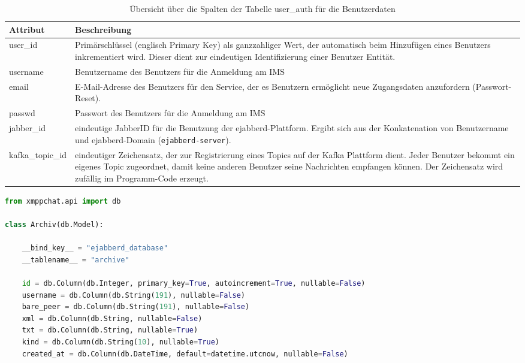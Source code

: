 \documentclass[a4paper,titlepage,halfparskip,12pt]{scrreprt}
\begin{document}
\begin{table}[h]
\centering
\caption{Übersicht über die Spalten der Tabelle user\_auth für die Benutzerdaten}
\begin{tabular}{|l|p{}|}
\hline
\textbf{Attribut} & \textbf{Beschreibung} \\
\hline
user\_id & Primärschlüssel (englisch Primary Key) als ganzzahliger Wert, der automatisch beim Hinzufügen eines Benutzers inkrementiert wird. Dieser dient zur eindeutigen Identifizierung einer Benutzer Entität.\\
\hline
username & Benutzername des Benutzers für die Anmeldung am \acs{IMS}\\
\hline
email & E-Mail-Adresse des Benutzers für den Service, der es Benutzern ermöglicht neue Zugangsdaten anzufordern (Passwort-Reset).\\
\hline
passwd & Passwort des Benutzers für die Anmeldung am \acs{IMS}\\
\hline
jabber\_id & eindeutige JabberID für die Benutzung der ejabberd-Plattform. Ergibt sich aus der Konkatenation von Benutzername und ejabberd-Domain (\texttt{ejabberd-server}).\\
\hline
kafka\_topic\_id & eindeutiger Zeichensatz, der zur Registrierung eines Topics auf der Kafka Plattform dient. Jeder Benutzer bekommt ein eigenes Topic zugeordnet, damit keine anderen Benutzer seine Nachrichten empfangen können. Der Zeichensatz wird zufällig im Programm-Code erzeugt.\\
\hline
\end{tabular}
\label{tab:descriptionUserClass}
\end{table}

\pagebreak

\begin{lstlisting}[language=python, caption={SQLAlchemy Schema für die Tabelle der Chatverläufe von ejabberd}, label={lst:flaskClassArchiv}]
from xmppchat.api import db

class Archiv(db.Model):

    __bind_key__ = "ejabberd_database"
    __tablename__ = "archive"

    id = db.Column(db.Integer, primary_key=True, autoincrement=True, nullable=False)
    username = db.Column(db.String(191), nullable=False)
    bare_peer = db.Column(db.String(191), nullable=False)
    xml = db.Column(db.String, nullable=False)
    txt = db.Column(db.String, nullable=True)
    kind = db.Column(db.String(10), nullable=True)
    created_at = db.Column(db.DateTime, default=datetime.utcnow, nullable=False)

\end{lstlisting}
\end{document}
